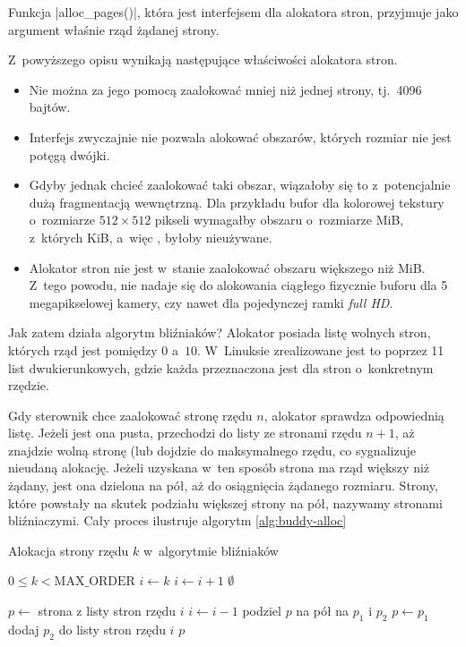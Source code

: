 Funkcja \code|alloc_pages()|, która jest interfejsem dla
alokatora stron, przyjmuje jako argument właśnie rząd żądanej strony.

Z~powyższego opisu wynikają następujące właściwości alokatora stron.

\begin{itemize}
\item Nie można za jego pomocą zaalokować mniej niż jednej strony,
  tj.\ 4096 bajtów.
\item Interfejs zwyczajnie nie pozwala alokować obszarów, których
  rozmiar nie jest potęgą dwójki.
\item Gdyby jednak chcieć zaalokować taki obszar, wiązałoby się to
  z~potencjalnie dużą fragmentacją wewnętrzną.  Dla przykładu bufor
  dla kolorowej tekstury o~rozmiarze $512 \times 512$ pikseli
  wymagałby obszaru o~rozmiarze \unit[1]{MiB}, z~których
  \unit[256]{KiB}, a~więc , byłoby nieużywane.
\item Alokator stron nie jest w~stanie zaalokować obszaru większego
  niż \unit[4]{MiB}.  Z~tego powodu, nie nadaje się do alokowania
  ciągłego fizycznie buforu dla 5 megapikselowej kamery, czy nawet dla
  pojedynczej ramki {\it full HD}.
\end{itemize}

Jak zatem działa algorytm bliźniaków?  Alokator posiada listę wolnych
stron, których rząd jest pomiędzy $0$ a~$10$.  W~Linuksie zrealizowane
jest to poprzez 11 list dwukierunkowych, gdzie każda przeznaczona jest
dla stron o~konkretnym rzędzie.

Gdy sterownik chce zaalokować stronę rzędu $n$, alokator sprawdza
odpowiednią listę.  Jeżeli jest ona pusta, przechodzi do listy ze
stronami rzędu $n+1$, aż znajdzie wolną stronę (lub dojdzie do
maksymalnego rzędu, co sygnalizuje nieudaną alokację.  Jeżeli uzyskana
w~ten sposób strona ma rząd większy niż żądany, jest ona dzielona na
pół, aż do osiągnięcia żądanego rozmiaru.  Strony, które powstały na
skutek podziału większej strony na pół, nazywamy stronami
bliźniaczymi.  Cały proces ilustruje algorytm \ref{alg:buddy-alloc}

\begin{algorithm}\label{alg:buddy-alloc}
\caption{Alokacja strony rzędu $k$ w~algorytmie bliźniaków}
\begin{algorithmic}[1]
\Require $0 \leq k < \mathrm{MAX\_ORDER}$
    \State $i \gets k$
        \State $i \gets i + 1$
            \State \Return $\emptyset$
        \EndIf
    \EndWhile

    \State $p \gets$ strona z listy stron rzędu $i$
        \State $i \gets i - 1$
        \State podziel $p$ na pół na $p_1$ i $p_2$
        \State $p \gets p_1$
        \State dodaj $p_2$ do listy stron rzędu $i$
    \EndWhile
    \State \Return $p$
\EndFunction
\end{algorithmic}
\end{algorithm}

